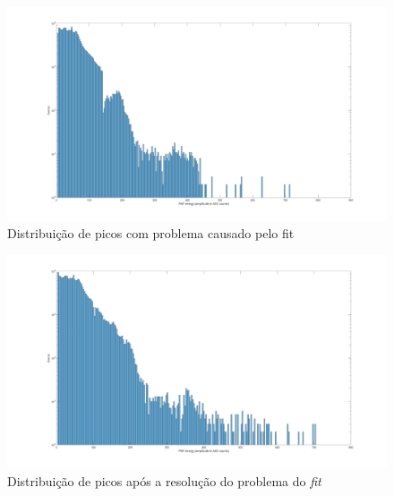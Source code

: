 \begin{figure}[H]
	\centering
	\hspace*{-2cm}
    \includegraphics[width=19cm]{textuais/dadosreais/figuras/peakdist_errado.png}
	\caption{Distribuição de picos com problema causado pelo fit}
	\label{fig:peakdist_errado}
\end{figure}
\begin{figure}[H]
	\centering
	\hspace*{-2cm}
	\includegraphics[width=19cm]{textuais/dadosreais/figuras/peakdist.png}
	\caption{Distribuição de picos após a resolução do problema do \emph{fit}}
	\label{fig:peakdist}
\end{figure}